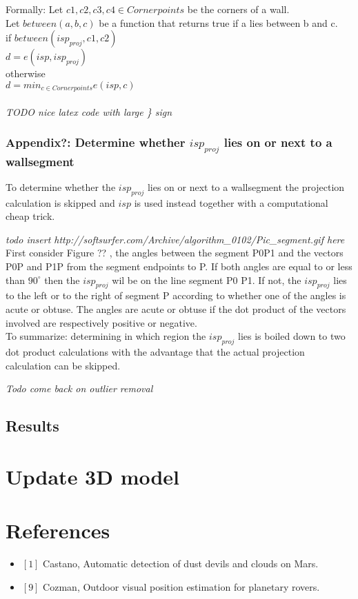 \documentclass[10pt]{article}
\begin{document}
Formally:
Let $c1,c2,c3,c4 \in Cornerpoints$ be the corners of a wall.\\
Let $between(a,b,c)$ be a function that returns true if a lies between b and c.\\
if $between(isp_{proj}, c1, c2)$\\
$d = e(isp, isp_{proj})$\\
otherwise\\
$d = min_{c \in Cornerpoints} e(isp, c)$\\
\\
\textit{TODO nice latex code with large \} sign}\\


\subsubsection{Appendix?: Determine whether $isp_{proj}$ lies on or next to a wallsegment}



To determine whether the $isp_{proj}$ lies on or next to a wallsegment the
projection calculation is skipped and $isp$ is used instead together with a
computational cheap trick.\\


\textit{ todo insert http://softsurfer.com/Archive/algorithm\_0102/Pic\_segment.gif here}\\
First consider Figure ?? , the angles between the segment P0P1 and the vectors P0P and P1P
from the segment endpoints to P. If both angles are equal to or less than
$90^{\circ}$ then the $isp_{proj}$ wil be on the line segment P0 P1.  If not,
the $isp_{proj}$ lies to the left or to the right of segment P according to
whether one of the angles is acute or obtuse.  The angles are acute or obtuse
if the dot product of the vectors involved are respectively positive or
	negative.\\
To summarize: determining in which region the $isp_{proj}$ lies is boiled down to
two dot product calculations with the advantage that the actual projection
calculation can be skipped.


\textit{Todo come back on outlier removal}
\subsection{Results}

\section{Update 3D model}


\section{References}
\begin{itemize}
\item $[1]$ Castano, Automatic detection of dust devils and clouds on Mars.
\item $[9]$ Cozman, Outdoor visual position estimation for planetary rovers.
\end{itemize}
\end{document}
